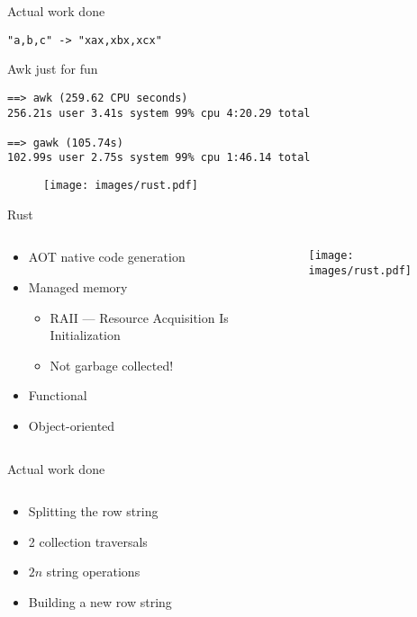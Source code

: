 \documentclass[aspectratio=169]{beamer}
\newcommand{\megatext}[1]{
  \begin{center}
    \Huge
    #1
  \end{center}
}
\begin{document}
\begin{frame}{Actual work done}
  \megatext{\texttt{"a,b,c" -> "xax,xbx,xcx"}}
\end{frame}


\begin{frame}[fragile]{Awk just for fun}
  \begin{verbatim}
==> awk (259.62 CPU seconds)
256.21s user 3.41s system 99% cpu 4:20.29 total

==> gawk (105.74s)
102.99s user 2.75s system 99% cpu 1:46.14 total
  \end{verbatim}
\end{frame}


\begin{frame}
  \begin{figure}
    \texttt{[image: images/rust.pdf]}
  \end{figure}
\end{frame}


\begin{frame}{Rust}
  \begin{columns}[c]
    \begin{column}{0.6\textwidth}
      \begin{itemize}
      \item AOT native code generation
      \item Managed memory
        \begin{itemize}
          \item RAII --- Resource Acquisition Is Initialization
          \item Not garbage collected!
        \end{itemize}
      \item Functional
      \item Object-oriented
      \end{itemize}
    \end{column}

    \begin{column}{0.4\textwidth}
      \begin{figure}
        \texttt{[image: images/rust.pdf]}
      \end{figure}
    \end{column}
  \end{columns}
\end{frame}


\begin{frame}[fragile]{Actual work done}
  \inputminted{rust}{snippets/handle_line.rs}

  \begin{itemize}
    \item Splitting the row string
    \item 2 collection traversals
    \item $2n$ string operations
    \item Building a new row string
  \end{itemize}
\end{frame}
\end{document}
